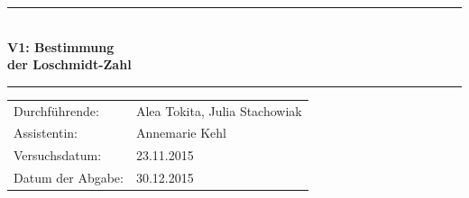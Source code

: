 \documentclass[12pt,a4paper,titlepage,headinclude,bibtotoc]{scrartcl}
\begin{document}
\begin{titlepage}
\centering

\vspace*{1cm}

\rule{\textwidth}{1pt}\\[0.5cm]
{\huge \bfseries
  V1: Bestimmung\\[1.5ex]
  der Loschmidt-Zahl}\\[0.5cm]
\rule{\textwidth}{1pt}

\vspace*{3cm}


\begin{Large}
\begin{tabular}{ll}
Durchführende: &  Alea Tokita, Julia Stachowiak\\
Assistentin: & Annemarie Kehl\\
 Versuchsdatum: & 23.11.2015\\
 Datum der Abgabe: & 30.12.2015\\
\end{tabular}
\end{Large}

\vspace*{1cm}

\begin{Large}
\end{Large}

\end{titlepage}

\tableofcontents
\end{document}
